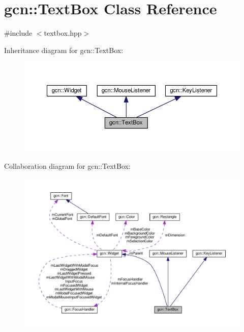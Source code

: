 \hypertarget{classgcn_1_1TextBox}{}\section{gcn\+:\+:Text\+Box Class Reference}
\label{classgcn_1_1TextBox}


{\ttfamily \#include $<$textbox.\+hpp$>$}



Inheritance diagram for gcn\+:\+:Text\+Box\+:\nopagebreak
\begin{figure}[H]
\begin{center}
\leavevmode
\includegraphics[width=350pt]{classgcn_1_1TextBox__inherit__graph}
\end{center}
\end{figure}


Collaboration diagram for gcn\+:\+:Text\+Box\+:\nopagebreak
\begin{figure}[H]
\begin{center}
\leavevmode
\includegraphics[width=350pt]{classgcn_1_1TextBox__coll__graph}
\end{center}
\end{figure}
